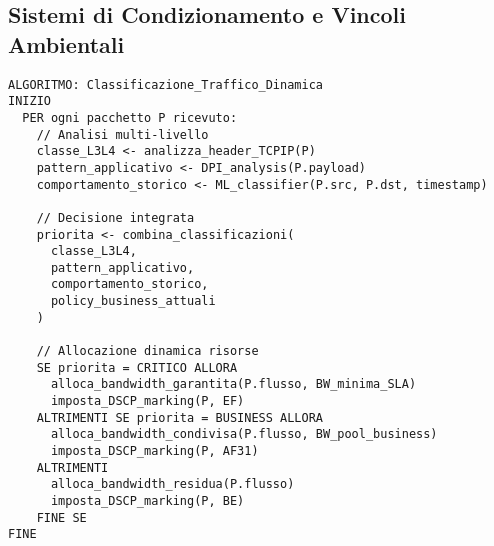 \subsection{Sistemi di Condizionamento e Vincoli Ambientali}
\label{ssec:condizionamento}

\begin{codeblock}
\begin{verbatim}
ALGORITMO: Classificazione_Traffico_Dinamica
INIZIO
  PER ogni pacchetto P ricevuto:
    // Analisi multi-livello
    classe_L3L4 <- analizza_header_TCPIP(P)
    pattern_applicativo <- DPI_analysis(P.payload)
    comportamento_storico <- ML_classifier(P.src, P.dst, timestamp)
    
    // Decisione integrata
    priorita <- combina_classificazioni(
      classe_L3L4, 
      pattern_applicativo, 
      comportamento_storico,
      policy_business_attuali
    )
    
    // Allocazione dinamica risorse
    SE priorita = CRITICO ALLORA
      alloca_bandwidth_garantita(P.flusso, BW_minima_SLA)
      imposta_DSCP_marking(P, EF)
    ALTRIMENTI SE priorita = BUSINESS ALLORA
      alloca_bandwidth_condivisa(P.flusso, BW_pool_business)
      imposta_DSCP_marking(P, AF31)
    ALTRIMENTI
      alloca_bandwidth_residua(P.flusso)
      imposta_DSCP_marking(P, BE)
    FINE SE
FINE
\end{verbatim}
\end{codeblock}

